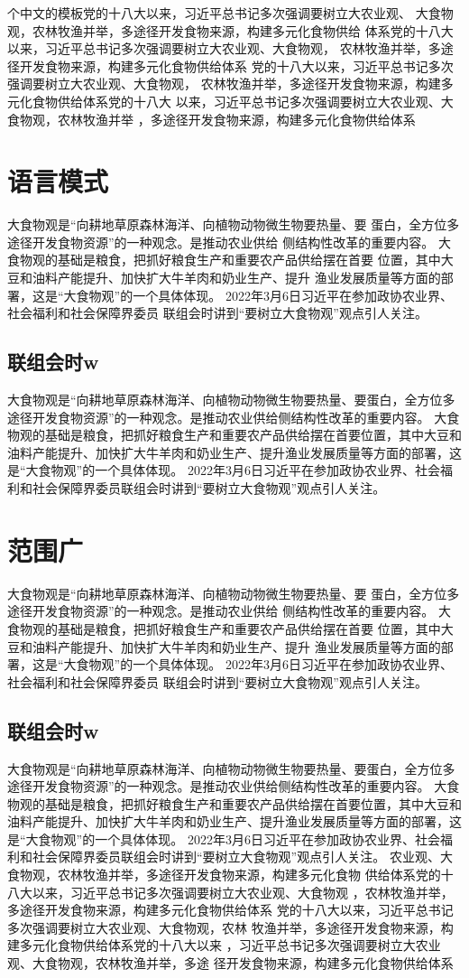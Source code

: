 个中文的模板党的十八大以来，习近平总书记多次强调要树立大农业观、
大食物观，农林牧渔并举，多途径开发食物来源，构建多元化食物供给
体系党的十八大以来，习近平总书记多次强调要树立大农业观、大食物观，
农林牧渔并举，多途径开发食物来源，构建多元化食物供给体系
党的十八大以来，习近平总书记多次强调要树立大农业观、大食物观，
农林牧渔并举，多途径开发食物来源，构建多元化食物供给体系党的十八大
以来，习近平总书记多次强调要树立大农业观、大食物观，农林牧渔并举
，多途径开发食物来源，构建多元化食物供给体系
	\section{语言模式}
	大食物观是“向耕地草原森林海洋、向植物动物微生物要热量、要
	蛋白，全方位多途径开发食物资源”的一种观念。是推动农业供给
	侧结构性改革的重要内容。
大食物观的基础是粮食，把抓好粮食生产和重要农产品供给摆在首要
位置，其中大豆和油料产能提升、加快扩大牛羊肉和奶业生产、提升
渔业发展质量等方面的部署，这是“大食物观”的一个具体体现。
2022年3月6日习近平在参加政协农业界、社会福利和社会保障界委员
联组会时讲到“要树立大食物观”观点引人关注。
\subsection{联组会时w}
大食物观是“向耕地草原森林海洋、向植物动物微生物要热量、要蛋白，全方位多途径开发食物资源”的一种观念。是推动农业供给侧结构性改革的重要内容。
大食物观的基础是粮食，把抓好粮食生产和重要农产品供给摆在首要位置，其中大豆和油料产能提升、加快扩大牛羊肉和奶业生产、提升渔业发展质量等方面的部署，这是“大食物观”的一个具体体现。
2022年3月6日习近平在参加政协农业界、社会福利和社会保障界委员联组会时讲到“要树立大食物观”观点引人关注。
\section{范围广}
大食物观是“向耕地草原森林海洋、向植物动物微生物要热量、要
蛋白，全方位多途径开发食物资源”的一种观念。是推动农业供给
侧结构性改革的重要内容。
大食物观的基础是粮食，把抓好粮食生产和重要农产品供给摆在首要
位置，其中大豆和油料产能提升、加快扩大牛羊肉和奶业生产、提升
渔业发展质量等方面的部署，这是“大食物观”的一个具体体现。
2022年3月6日习近平在参加政协农业界、社会福利和社会保障界委员
联组会时讲到“要树立大食物观”观点引人关注。
\subsection{联组会时w}
大食物观是“向耕地草原森林海洋、向植物动物微生物要热量、要蛋白，全方位多途径开发食物资源”的一种观念。是推动农业供给侧结构性改革的重要内容。
大食物观的基础是粮食，把抓好粮食生产和重要农产品供给摆在首要位置，其中大豆和油料产能提升、加快扩大牛羊肉和奶业生产、提升渔业发展质量等方面的部署，这是“大食物观”的一个具体体现。
2022年3月6日习近平在参加政协农业界、社会福利和社会保障界委员联组会时讲到“要树立大食物观”观点引人关注。
农业观、大食物观，农林牧渔并举，多途径开发食物来源，构建多元化食物
供给体系党的十八大以来，习近平总书记多次强调要树立大农业观、大食物观
，农林牧渔并举，多途径开发食物来源，构建多元化食物供给体系
党的十八大以来，习近平总书记多次强调要树立大农业观、大食物观，农林
牧渔并举，多途径开发食物来源，构建多元化食物供给体系党的十八大以来
，习近平总书记多次强调要树立大农业观、大食物观，农林牧渔并举，多途
径开发食物来源，构建多元化食物供给体系	

